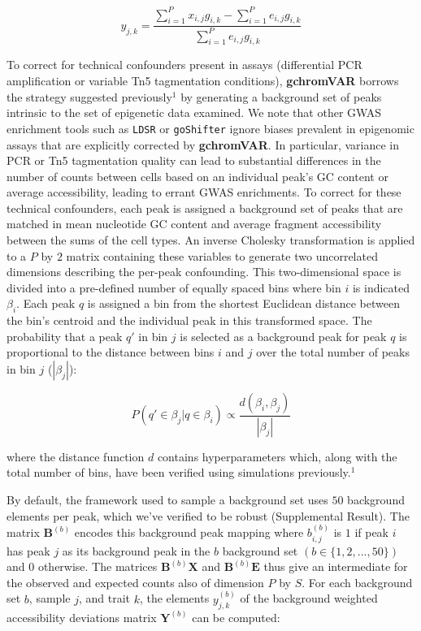 \documentclass{article}\usepackage[]{graphicx}\usepackage[]{color}
\begin{document}
$$ y_{j,k} = \frac{\sum_{i=1}^P x_{i,j}g_{i,k} - \sum_{i=1}^P  e_{i,j}g_{i,k}}{\sum_{i=1}^P  e_{i,j} g_{i,k} }$$

\noindent To correct for technical confounders present in assays (differential PCR amplification or variable Tn5 tagmentation conditions), \textbf{gchromVAR} borrows the strategy suggested previously$^1$ by generating a background set of peaks intrinsic to the set of epigenetic data examined. We note that other GWAS enrichment tools such as \texttt{LDSR} or \texttt{goShifter} ignore biases prevalent in epigenomic assays that are explicitly corrected by \textbf{gchromVAR}. In particular, variance in PCR or Tn5 tagmentation quality can lead to substantial differences in the number of counts between cells based on an individual peak's GC content or average accessibility, leading to errant GWAS enrichments. To correct for these technical confounders, each peak is assigned a background set of peaks that are matched in mean nucleotide GC content and average fragment accessibility between the sums of the cell types. An inverse Cholesky transformation is applied to a $P$ by $2$ matrix containing these variables to generate two uncorrelated dimensions describing the per-peak confounding. This two-dimensional space is divided into a pre-defined number of equally spaced bins where bin $i$ is indicated $\beta_i$. Each peak $q$ is assigned a bin from the shortest Euclidean distance between the bin's centroid and the individual peak in this transformed space. The probability that a peak $q'$ in bin $j$ is selected as a background peak for peak $q$ is proportional to the distance between bins $i$ and $j$ over the total number of peaks in bin $j$ ($|\beta_j|$):

$$ P(q' \in \beta_j | q \in \beta_i) \propto \frac{d(\beta_i, \beta_j)}{|\beta_j|}$$

\noindent where the distance function $d$ contains hyperparameters which, along with the total number of bins, have been verified using simulations previously.$^1$ \newline

\noindent By default, the framework used to sample a background set uses $50$ background elements per peak, which we've verified to be robust (Supplemental Result). The matrix $\boldsymbol{B}^{(b)}$ encodes this background peak mapping where $b_{i,j}^{(b)}$ is $1$ if peak $i$ has peak $j$ as its background peak in the $b$ background set $(b \in \{1,2,...,50\})$ and $0$ otherwise. The matrices $\boldsymbol{B}^{(b)}\boldsymbol{X}$ and $\boldsymbol{B}^{(b)}\boldsymbol{E}$ thus give an intermediate for the observed and expected counts also of dimension $P$ by $S$. For each background set $b$, sample $j$, and trait $k$, the elements $y_{j,k}^{(b)}$ of the background weighted accessibility deviations matrix $\boldsymbol{Y}^{(b)}$ can be computed: 
\end{document}
